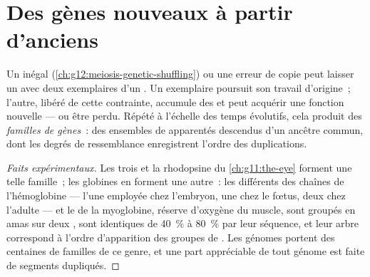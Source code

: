 \section{Des gènes nouveaux à partir d'anciens}

\begin{proposition}\label{prop:g12:diversification-of-life:duplication}
Un  inégal (\cref{ch:g12:meiosis-genetic-shuffling}) ou
une erreur de copie peut laisser un  avec deux exemplaires
d'un . Un exemplaire poursuit son travail d'origine~; l'autre,
libéré de cette contrainte, accumule des  et peut acquérir une
fonction nouvelle --- ou être perdu. Répété à l'échelle des temps
évolutifs, cela produit des \emph{familles de gènes}~:
des ensembles de  apparentés descendus d'un ancêtre commun, dont
les degrés de ressemblance enregistrent l'ordre des duplications.
\end{proposition}
\begin{proof}[Faits expérimentaux]
Les trois  et la rhodopsine du \cref{ch:g11:the-eye} forment une
telle famille~; les globines en forment une autre~: les différents
 des chaînes de l'hémoglobine --- l'une employée chez l'embryon,
une chez le fœtus, deux chez l'adulte --- et le  de la myoglobine,
réserve d'oxygène du muscle, sont groupés en amas sur deux ,
sont identiques de 40~\% à 80~\% par leur séquence, et leur arbre
correspond à l'ordre d'apparition des groupes de . Les génomes
portent des centaines de familles de ce genre, et une part appréciable
de tout génome est faite de segments dupliqués.
\end{proof}

